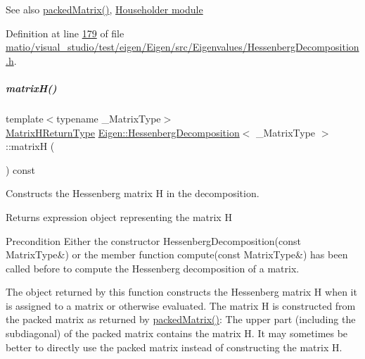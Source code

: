 \begin{DoxySeeAlso}{See also}
\hyperlink{group___eigenvalues___module_a1f72b7612fd4edc5a6f31005e433e1dd}{packed\+Matrix()}, \hyperlink{group___householder___module}{Householder module} 
\end{DoxySeeAlso}


Definition at line \hyperlink{matio_2visual__studio_2test_2eigen_2_eigen_2src_2_eigenvalues_2_hessenberg_decomposition_8h_source_l00179}{179} of file \hyperlink{matio_2visual__studio_2test_2eigen_2_eigen_2src_2_eigenvalues_2_hessenberg_decomposition_8h_source}{matio/visual\+\_\+studio/test/eigen/\+Eigen/src/\+Eigenvalues/\+Hessenberg\+Decomposition.\+h}.

\mbox{\label{group___eigenvalues___module_a8e781d2e22a2304647bcf0ae913cc8ea}} 
\subparagraph{\texorpdfstring{matrix\+H()}{matrixH()}\hspace{0.1cm}{\footnotesize\ttfamily [1/2]}}
{\footnotesize\ttfamily template$<$typename \+\_\+\+Matrix\+Type$>$ \\
\hyperlink{group___eigenvalues___module_struct_eigen_1_1internal_1_1_hessenberg_decomposition_matrix_h_return_type}{Matrix\+H\+Return\+Type} \hyperlink{group___eigenvalues___module_class_eigen_1_1_hessenberg_decomposition}{Eigen\+::\+Hessenberg\+Decomposition}$<$ \+\_\+\+Matrix\+Type $>$\+::matrixH (\begin{DoxyParamCaption}{ }\end{DoxyParamCaption}) const\hspace{0.3cm}{\ttfamily [inline]}}



Constructs the Hessenberg matrix H in the decomposition. 

\begin{DoxyReturn}{Returns}
expression object representing the matrix H
\end{DoxyReturn}
\begin{DoxyPrecond}{Precondition}
Either the constructor Hessenberg\+Decomposition(const Matrix\+Type\&) or the member function compute(const Matrix\+Type\&) has been called before to compute the Hessenberg decomposition of a matrix.
\end{DoxyPrecond}
The object returned by this function constructs the Hessenberg matrix H when it is assigned to a matrix or otherwise evaluated. The matrix H is constructed from the packed matrix as returned by \hyperlink{group___eigenvalues___module_a1f72b7612fd4edc5a6f31005e433e1dd}{packed\+Matrix()}\+: The upper part (including the subdiagonal) of the packed matrix contains the matrix H. It may sometimes be better to directly use the packed matrix instead of constructing the matrix H.

